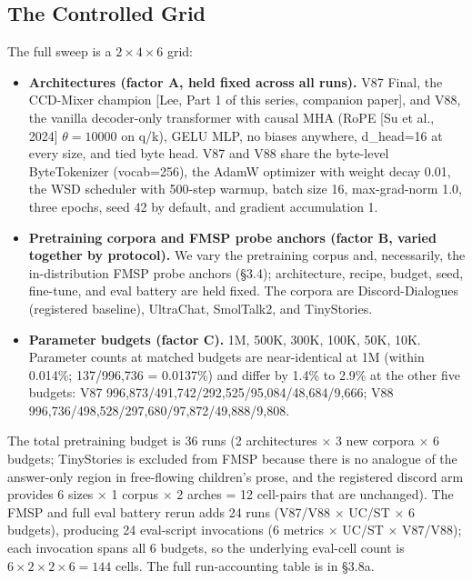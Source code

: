 \documentclass[11pt]{article}
\begin{document}
\subsection{The Controlled Grid}

The full sweep is a $2 \times 4 \times 6$ grid:

\begin{itemize}
  \item \textbf{Architectures (factor A, held fixed across all runs).} V87 Final, the CCD-Mixer champion [Lee, Part 1 of this series, companion paper], and V88, the vanilla decoder-only transformer with causal MHA (RoPE [Su et al., 2024] $\theta=10000$ on q/k), GELU MLP, no biases anywhere, d\_head=16 at every size, and tied byte head. V87 and V88 share the byte-level ByteTokenizer (vocab=256), the AdamW optimizer with weight decay 0.01, the WSD scheduler with 500-step warmup, batch size 16, max-grad-norm 1.0, three epochs, seed 42 by default, and gradient accumulation 1.
  \item \textbf{Pretraining corpora and FMSP probe anchors (factor B, varied together by protocol).} We vary the pretraining corpus and, necessarily, the in-distribution FMSP probe anchors (\S3.4); architecture, recipe, budget, seed, fine-tune, and eval battery are held fixed. The corpora are Discord-Dialogues (registered baseline), UltraChat, SmolTalk2, and TinyStories.
  \item \textbf{Parameter budgets (factor C).} 1M, 500K, 300K, 100K, 50K, 10K. Parameter counts at matched budgets are near-identical at 1M (within 0.014\%; 137/996,736 = 0.0137\%) and differ by 1.4\% to 2.9\% at the other five budgets: V87 996,873/491,742/292,525/95,084/48,684/9,666; V88 996,736/498,528/297,680/97,872/49,888/9,808.
\end{itemize}

The total pretraining budget is 36 runs (2 architectures $\times$ 3 new corpora $\times$ 6 budgets; TinyStories is excluded from FMSP because there is no analogue of the answer-only region in free-flowing children's prose, and the registered discord arm provides 6 sizes $\times$ 1 corpus $\times$ 2 arches = 12 cell-pairs that are unchanged). The FMSP and full eval battery rerun adds 24 runs (V87/V88 $\times$ UC/ST $\times$ 6 budgets), producing 24 eval-script invocations (6 metrics $\times$ UC/ST $\times$ V87/V88); each invocation spans all 6 budgets, so the underlying eval-cell count is $6 \times 2 \times 2 \times 6 = 144$ cells. The full run-accounting table is in \S3.8a.
\end{document}
